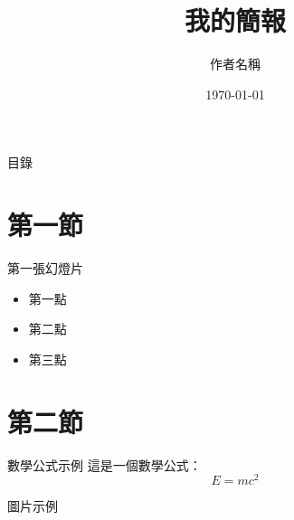 \documentclass{beamer}
\title{我的簡報}
\author{作者名稱}
\date{\today}
\begin{document}
\begin{frame}
    \titlepage
\end{frame}

\begin{frame}{目錄}
    \tableofcontents
\end{frame}

\section{第一節}
\begin{frame}{第一張幻燈片}
    \begin{itemize}
        \item 第一點
        \item 第二點
        \item 第三點
    \end{itemize}
\end{frame}

\section{第二節}
\begin{frame}{數學公式示例}
    這是一個數學公式：
    \[
    E = mc^2
    \]
\end{frame}

\begin{frame}{圖片示例}
    \begin{center}
    \end{center}
\end{frame}
\end{document}
